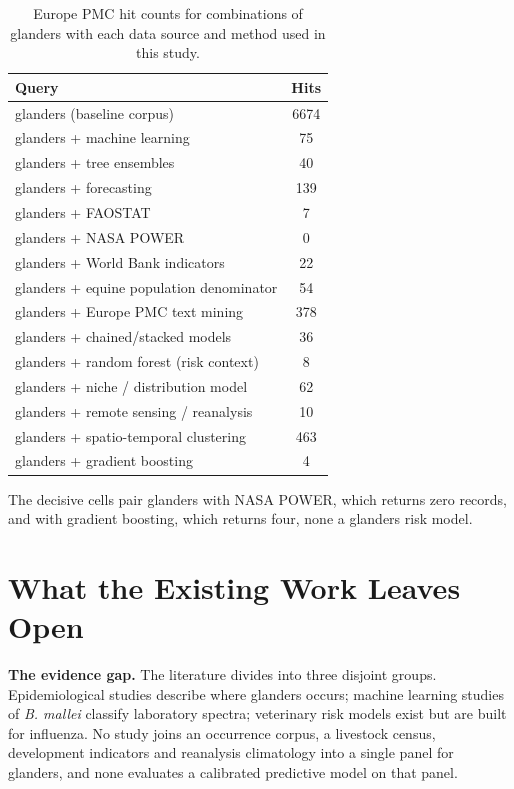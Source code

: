 \documentclass[10pt,openany]{report}
\begin{document}
\begin{table}[htbp]
\centering
\caption{Europe PMC hit counts for combinations of glanders with each data source and method used
in this study.}
\label{tab:novelty}
\small
\begin{tabular}{@{}lc@{}}
\toprule
\textbf{Query} & \textbf{Hits} \\
\midrule
glanders (baseline corpus) & 6674 \\
glanders + machine learning & 75 \\
glanders + tree ensembles & 40 \\
glanders + forecasting & 139 \\
glanders + FAOSTAT & 7 \\
glanders + NASA POWER & 0 \\
glanders + World Bank indicators & 22 \\
glanders + equine population denominator & 54 \\
glanders + Europe PMC text mining & 378 \\
glanders + chained/stacked models & 36 \\
glanders + random forest (risk context) & 8 \\
glanders + niche / distribution model & 62 \\
glanders + remote sensing / reanalysis & 10 \\
glanders + spatio-temporal clustering & 463 \\
glanders + gradient boosting & 4 \\
\bottomrule
\end{tabular}
\end{table}

The decisive cells pair glanders with NASA POWER, which returns zero records, and with gradient
boosting, which returns four, none a glanders risk model.

\section{What the Existing Work Leaves Open}

\textbf{The evidence gap.} The literature divides into three disjoint groups. Epidemiological studies
describe where glanders occurs; machine learning studies of \textit{B. mallei} classify laboratory
spectra; veterinary risk models exist but are built for influenza. No study joins an occurrence
corpus, a livestock census, development indicators and reanalysis climatology into a single panel
for glanders, and none evaluates a calibrated predictive model on that panel.
\end{document}
